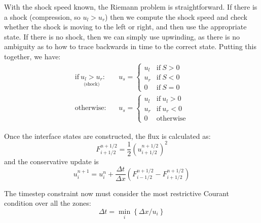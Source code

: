 With the shock speed known, the Riemann problem is straightforward.  If there
is a shock (compression, so $u_l > u_r$) then we compute the shock speed and
check whether the shock is moving to the left or right, and then use the appropriate
state.  If there is no shock, then we can simply use upwinding, as there is no
ambiguity as to how to trace backwards in time to the correct state.
Putting this together, we have:
\begin{eqnarray}
\mathrm{if~} \underset{\text{(shock)}}{u_l > u_r}:&& u_s = \left \{ \begin{array}{cl}
                u_l & \mathrm{if~} S > 0 \\
                u_r & \mathrm{if~} S < 0 \\
                0   & \mathrm{if~} S = 0 \end{array} \right .   \\[1em]
%
\mathrm{otherwise:}&& u_s = \left \{ \begin{array}{clc}
                u_l & \mathrm{if~} u_l > 0 \\
                u_r & \mathrm{if~} u_r < 0 \\
                0   & \mathrm{otherwise} \end{array} \right .
\end{eqnarray}

Once the interface states are constructed, the flux is calculated as:
\begin{equation}
F^{n+1/2}_{i+1/2} = \frac{1}{2} \left (u_{i+1/2}^{n+1/2} \right )^2
\end{equation}
and the conservative update is
\begin{equation}
u_i^{n+1} = u_i^n + \frac{\Delta t}{\Delta x}
   \left ( F_{i-1/2}^{n+1/2} - F_{i+1/2}^{n+1/2} \right )
\end{equation}

The timestep constraint now must consider the most restrictive Courant
condition over all the zones:
\begin{equation}
\Delta t = \min_i \left \{ \Delta x / u_i \right \}
\end{equation}


